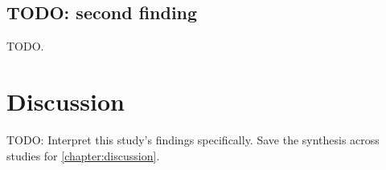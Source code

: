 
		\subsection{TODO: second finding}

			TODO.

	\section{Discussion}\label{section:study-one:discussion}

		TODO: Interpret this study's findings specifically. Save the synthesis
		across studies for \cref{chapter:discussion}.

